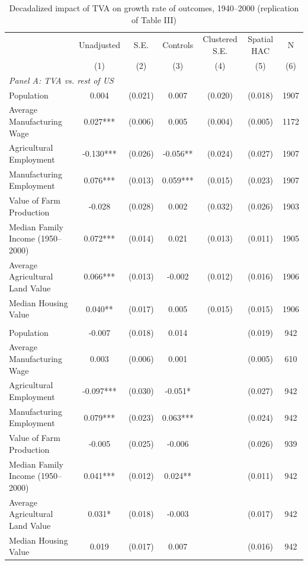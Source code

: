 \begin{table}[htbp]
\centering
\footnotesize
\setlength{\tabcolsep}{4pt}
\caption{Decadalized impact of TVA on growth rate of outcomes, 1940--2000 (replication of Table III)}
\label{tab:km_t3}
\begin{tabular}{lcccccc}
\toprule
 & Unadjusted & S.E. & Controls & Clustered S.E. & Spatial HAC & N \\
 & (1) & (2) & (3) & (4) & (5) & (6) \\
\midrule
\multicolumn{7}{l}{\textit{Panel A: TVA vs. rest of US}} \\
Population & 0.004 & (0.021) & 0.007 & (0.020) & (0.018) & 1907 \\
Average Manufacturing Wage & 0.027*** & (0.006) & 0.005 & (0.004) & (0.005) & 1172 \\
Agricultural Employment & -0.130*** & (0.026) & -0.056** & (0.024) & (0.027) & 1907 \\
Manufacturing Employment & 0.076*** & (0.013) & 0.059*** & (0.015) & (0.023) & 1907 \\
Value of Farm Production & -0.028 & (0.028) & 0.002 & (0.032) & (0.026) & 1903 \\
Median Family Income (1950--2000) & 0.072*** & (0.014) & 0.021 & (0.013) & (0.011) & 1905 \\
Average Agricultural Land Value & 0.066*** & (0.013) & -0.002 & (0.012) & (0.016) & 1906 \\
Median Housing Value & 0.040** & (0.017) & 0.005 & (0.015) & (0.015) & 1906 \\
\addlinespace
\multicolumn{7}{l}{\textit{Panel B: TVA vs. US South}} \\
Population & -0.007 & (0.018) & 0.014 &  & (0.019) & 942 \\
Average Manufacturing Wage & 0.003 & (0.006) & 0.001 &  & (0.005) & 610 \\
Agricultural Employment & -0.097*** & (0.030) & -0.051* &  & (0.027) & 942 \\
Manufacturing Employment & 0.079*** & (0.023) & 0.063*** &  & (0.024) & 942 \\
Value of Farm Production & -0.005 & (0.025) & -0.006 &  & (0.026) & 939 \\
Median Family Income (1950--2000) & 0.041*** & (0.012) & 0.024** &  & (0.011) & 942 \\
Average Agricultural Land Value & 0.031* & (0.018) & -0.003 &  & (0.017) & 942 \\
Median Housing Value & 0.019 & (0.017) & 0.007 &  & (0.016) & 942 \\

\end{tabular}
\end{table}
